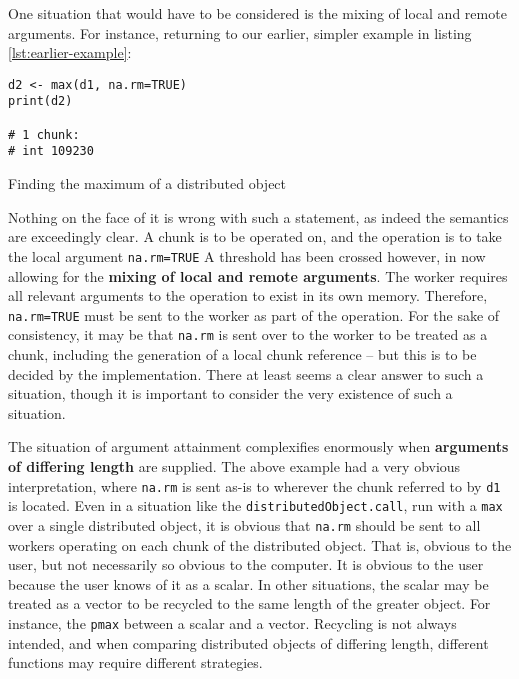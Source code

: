One situation that would have to be considered is the mixing of local
and remote arguments. For instance, returning to our earlier, simpler
example in listing \ref{lst:earlier-example}:

\begin{listing}
    \begin{verbatim}
d2 <- max(d1, na.rm=TRUE)
print(d2)

# 1 chunk:
# int 109230
    \end{verbatim}
    \caption{Finding the maximum of a distributed object}
    \label{lst:earlier-example}
\end{listing}

Nothing on the face of it is wrong with such a statement, as indeed the
semantics are exceedingly clear. A chunk is to be operated on, and the
operation is to take the local argument \texttt{na.rm=TRUE} A threshold
has been crossed however, in now allowing for the \textbf{mixing of
    local and remote arguments}. The worker requires all relevant arguments
to the operation to exist in its own memory. Therefore,
\texttt{na.rm=TRUE} must be sent to the worker as part of the operation.
For the sake of consistency, it may be that \texttt{na.rm} is sent over
to the worker to be treated as a chunk, including the generation of a
local chunk reference -- but this is to be decided by the
implementation. There at least seems a clear answer to such a situation,
though it is important to consider the very existence of such a
situation.

The situation of argument attainment complexifies enormously when
\textbf{arguments of differing length} are supplied. The above example
had a very obvious interpretation, where \texttt{na.rm} is sent as-is to
wherever the chunk referred to by \texttt{d1} is located. Even in a
situation like the \texttt{distributedObject.call}, run with a
\texttt{max} over a single distributed object, it is obvious that
\texttt{na.rm} should be sent to all workers operating on each chunk of
the distributed object. That is, obvious to the user, but not
necessarily so obvious to the computer. It is obvious to the user
because the user knows of it as a scalar. In other situations, the
scalar may be treated as a vector to be recycled to the same length of
the greater object. For instance, the \texttt{pmax} between a scalar and
a vector. Recycling is not always intended, and when comparing
distributed objects of differing length, different functions may require
different strategies.

